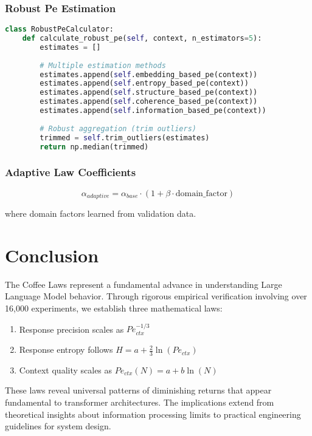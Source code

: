 \documentclass[conference]{IEEEtran}
\begin{document}
\subsubsection{Robust Pe Estimation}

\begin{lstlisting}[language=Python, basicstyle=\small]
class RobustPeCalculator:
    def calculate_robust_pe(self, context, n_estimators=5):
        estimates = []
        
        # Multiple estimation methods
        estimates.append(self.embedding_based_pe(context))
        estimates.append(self.entropy_based_pe(context))
        estimates.append(self.structure_based_pe(context))
        estimates.append(self.coherence_based_pe(context))
        estimates.append(self.information_based_pe(context))
        
        # Robust aggregation (trim outliers)
        trimmed = self.trim_outliers(estimates)
        return np.median(trimmed)
\end{lstlisting}

\subsubsection{Adaptive Law Coefficients}

\begin{equation}
\alpha_{adaptive} = \alpha_{base} \cdot (1 + \beta \cdot \text{domain\_factor})
\end{equation}

where domain factors learned from validation data.

\section{Conclusion}

The Coffee Laws represent a fundamental advance in understanding Large Language Model behavior. Through rigorous empirical verification involving over 16,000 experiments, we establish three mathematical laws:

\begin{enumerate}
\item Response precision scales as $Pe_{ctx}^{-1/3}$
\item Response entropy follows $H = a + \frac{2}{3}\ln(Pe_{ctx})$
\item Context quality scales as $Pe_{ctx}(N) = a + b\ln(N)$
\end{enumerate}

These laws reveal universal patterns of diminishing returns that appear fundamental to transformer architectures. The implications extend from theoretical insights about information processing limits to practical engineering guidelines for system design.
\end{document}
